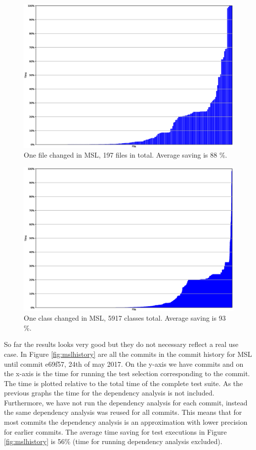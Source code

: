 \documentclass{cslthse-msc}
\begin{document}
\begin{figure}[!htbp]
    \centering
    \includegraphics[width=\textwidth]{Graphs/MSL_one_file.eps}
    \caption{One file changed in MSL, 197 files in total. Average saving is 88 \%.}
    \label{fig:mslonefile}
\end{figure}

\begin{figure}[!htbp]
    \centering
    \includegraphics[width=\textwidth]{Graphs/MSL_one_model.eps}
    \caption{One class changed in MSL, 5917 classes total. Average saving is 93 \%. }
    \label{fig:mslonemodel}
\end{figure}

So far the results looks very good but they do not necessary reflect a real use case. In Figure \ref{fig:mslhistory} are all the commits in the commit history for MSL until commit e69f57, 24th of may 2017. On the y-axis we have commits and on the x-axis is the time for running the test selection corresponding to the commit. The time is plotted relative to the total time of the complete test suite. As the previous graphs the time for the dependency analysis is not included. Furthermore, we have not run the dependency analysis for each commit, instead the same dependency analysis was reused for all commits. This means that for most commits the dependency analysis is an approximation with lower precision for earlier commits. The average time saving for test executions in Figure \ref{fig:mslhistory} is 56\% (time for running dependency analysis excluded).
\end{document}
